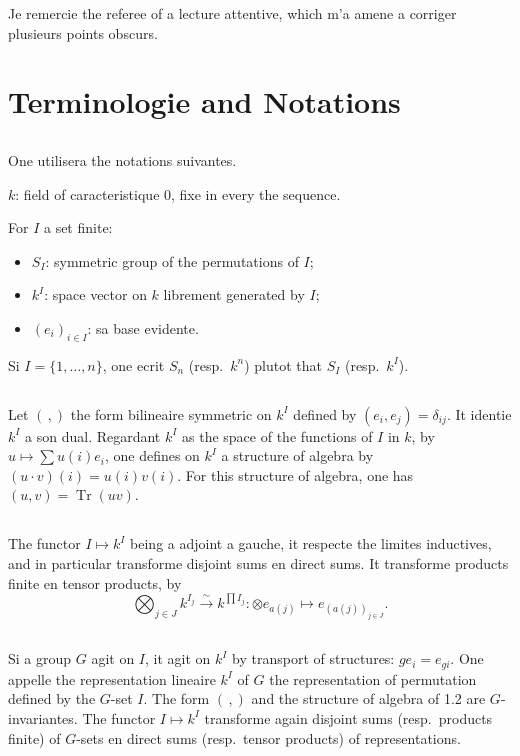 \documentclass[11pt,a4paper]{article}
\theoremstyle{plain}
\theoremstyle{definition}
\DeclareMathOperator{\Tr}{Tr}
\newcommand{\isom}{\xrightarrow{\sim}}
\begin{document}
Je remercie the referee of a lecture attentive, which m'a amene a corriger plusieurs points obscurs.


\section{Terminologie and Notations}

\subsection{}
One utilisera the notations suivantes.

$k$: field of caracteristique $0$, fixe in every the sequence.

For $I$ a set finite:
\begin{itemize}[label={},leftmargin=*]
\item $S_I$: symmetric group of the permutations of $I$;
\item $k^I$: space vector on $k$ librement generated by $I$;
\item $(e_i)_{i \in I}$: sa base evidente.
\end{itemize}
Si $I = \{1, \ldots, n\}$, one ecrit $S_n$ (resp.~$k^n$) plutot that $S_I$ (resp.~$k^I$).

\subsection{}
Let $(\,,)$ the form bilineaire symmetric on $k^I$ defined by $(e_i, e_j) = \delta_{ij}$. It identie $k^I$ a son dual. Regardant $k^I$ as the space of the functions of $I$ in $k$, by $u \mapsto \sum u(i) e_i$, one defines on $k^I$ a structure of algebra by $(u \cdot v)(i) = u(i) v(i)$. For this structure of algebra, one has $(u, v) = \Tr(uv)$.

\subsection{}
The functor $I \mapsto k^I$ being a adjoint a gauche, it respecte the limites inductives, and in particular transforme disjoint sums en direct sums. It transforme products finite en tensor products, by
\[
\bigotimes_{j \in J} k^{I_j} \isom k^{\prod I_j} : \otimes e_{a(j)} \longmapsto e_{(a(j))_{j \in J}}.
\]

\subsection{}
Si a group $G$ agit on $I$, it agit on $k^I$ by transport of structures: $ge_i = e_{gi}$. One appelle the representation lineaire $k^I$ of $G$ the representation of permutation defined by the $G$-set $I$. The form $(\,,)$ and the structure of algebra of 1.2 are $G$-invariantes. The functor $I \mapsto k^I$ transforme again disjoint sums (resp.~products finite) of $G$-sets en direct sums (resp.~tensor products) of representations.
\end{document}
